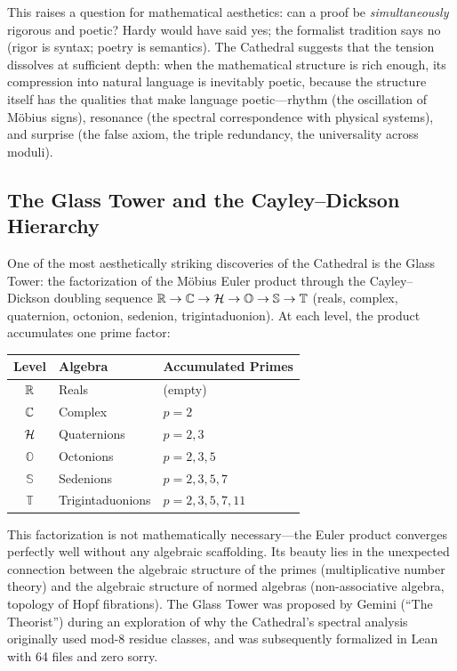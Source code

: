 This raises a question for mathematical aesthetics: can a proof
be \emph{simultaneously} rigorous and poetic? Hardy would have
said yes; the formalist tradition says no (rigor is syntax;
poetry is semantics). The Cathedral suggests that the tension
dissolves at sufficient depth: when the mathematical structure
is rich enough, its compression into natural language is
inevitably poetic, because the structure itself has the
qualities that make language poetic---rhythm (the oscillation of
M\"obius signs), resonance (the spectral correspondence with
physical systems), and surprise (the false axiom, the
triple redundancy, the universality across moduli).

\subsection{The Glass Tower and the Cayley--Dickson Hierarchy}

One of the most aesthetically striking discoveries of the
Cathedral is the Glass Tower: the factorization of the M\"obius
Euler product through the Cayley--Dickson doubling sequence
$\mathbb{R} \to \mathbb{C} \to \mathcal{H} \to \mathbb{O} \to \mathbb{S} \to \mathbb{T}$
(reals, complex, quaternion, octonion, sedenion,
trigintaduonion). At each level, the product accumulates one
prime factor:

\begin{center}
\small
\begin{tabular}{@{}cll@{}}
\toprule
\textbf{Level} & \textbf{Algebra} & \textbf{Accumulated Primes} \\
\midrule
$\mathbb{R}$ & Reals & (empty) \\
$\mathbb{C}$ & Complex & $p = 2$ \\
$\mathcal{H}$ & Quaternions & $p = 2, 3$ \\
$\mathbb{O}$ & Octonions & $p = 2, 3, 5$ \\
$\mathbb{S}$ & Sedenions & $p = 2, 3, 5, 7$ \\
$\mathbb{T}$ & Trigintaduonions & $p = 2, 3, 5, 7, 11$ \\
\bottomrule
\end{tabular}
\end{center}

This factorization is not mathematically necessary---the Euler
product converges perfectly well without any algebraic
scaffolding. Its beauty lies in the unexpected connection between
the algebraic structure of the primes (multiplicative number
theory) and the algebraic structure of normed algebras
(non-associative algebra, topology of Hopf fibrations). The
Glass Tower was proposed by Gemini (``The Theorist'') during an
exploration of why the Cathedral's spectral analysis originally
used mod-8 residue classes, and was subsequently formalized in
Lean with 64 files and zero sorry.

